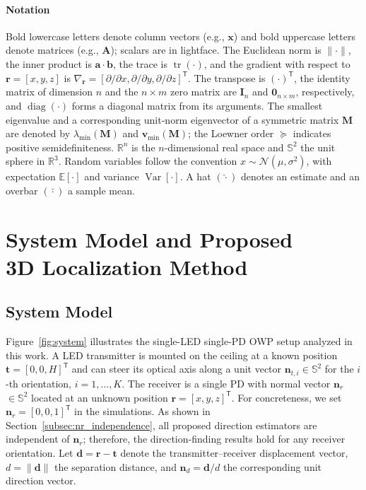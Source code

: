 \documentclass[journal]{IEEEtran}
\newcommand{\added}[1]{{\color{blue}#1}}
\begin{document}
\paragraph*{Notation}
Bold lowercase letters denote column vectors (e.g., $\mathbf x$) and bold uppercase letters denote matrices (e.g., $\mathbf A$); scalars are in lightface. The Euclidean norm is $\lVert\cdot\rVert$, the inner product is $\mathbf a\!\cdot\!\mathbf b$, the trace is $\operatorname{tr}(\cdot)$, and the gradient with respect to $\mathbf{r}=[x,y,z]$ is $\nabla_{\mathbf r}=[\partial/\partial x,\partial/\partial y,\partial/\partial z]^{\mathsf T}$. The transpose is $(\cdot)^{\mathsf T}$, 
the identity matrix of dimension $n$ and the $n\times m$ zero matrix are $\mathbf{I}_n$ and $\mathbf{0}_{n\times m}$, respectively, and $\operatorname{diag}(\cdot)$ forms a diagonal matrix from its arguments. The smallest eigenvalue and a corresponding unit‐norm eigenvector of a symmetric matrix $\mathbf M$ are denoted by $\lambda_{\min}(\mathbf M)$ and $\mathbf v_{\min}(\mathbf M)$; the Loewner order $\succeq$ indicates positive semidefiniteness. $\mathbb R^n$ is the $n$-dimensional real space and $\mathbb S^{2}$ the unit sphere in $\mathbb R^{3}$. Random variables follow the convention $x\sim\mathcal N(\mu,\sigma^{2})$, with expectation $\mathbb E[\cdot]$ and variance $\operatorname{Var}[\cdot]$. A hat $(\hat{\cdot})$ denotes an estimate and an overbar $(\bar{\cdot})$ a sample mean. 

 
\section{System Model and Proposed \\3D Localization Method}
\label{sec:SystemModel}
\subsection{System Model}

Figure~\ref{fig:system} illustrates the single-LED single-PD OWP setup analyzed in this work. A LED transmitter is mounted on the ceiling at a known position \(\mathbf{t}=[0,0,H]^{\mathsf T}\) and can steer its optical axis along a unit vector \(\mathbf{n}_{t,i}\!\in\!\mathbb{S}^{2}\) for the \(i\)-th orientation, \(i=1,\dots,K\). The receiver is a single PD with \added{normal vector} \(\mathbf{n}_{r}\) \added{$\in\mathbb{S}^2$} located at an unknown position \(\mathbf{r}=[x,y,z]^{\mathsf T}\). \added{For concreteness, we set $\mathbf{n}_r=[0,0,1]^{\mathsf T}$ in the simulations. As shown in Section~\ref{subsec:nr_independence}, all proposed direction estimators are independent of $\mathbf{n}_r$; therefore, the direction-finding results hold for any receiver orientation.} Let \(\mathbf{d}=\mathbf{r}-\mathbf{t}\) denote the transmitter--receiver displacement vector, \(d=\lVert \mathbf{d}\rVert\) the separation distance, and \(\mathbf{n}_{d}= \mathbf{d}/d\) the corresponding unit direction vector.
\end{document}
